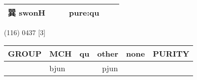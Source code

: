 \documentclass[14pt,a4paper]{scrartcl}
\begin{document}
\begin{longtable}[c]{@{}llllll@{}}
\begin{minipage}[t]{0.14\columnwidth}\raggedright\strut
巽 swonH
\strut\end{minipage} &
\begin{minipage}[t]{0.14\columnwidth}\raggedright\strut
\strut\end{minipage} &
\begin{minipage}[t]{0.14\columnwidth}\raggedright\strut
\strut\end{minipage} &
\begin{minipage}[t]{0.14\columnwidth}\raggedright\strut
pure:qu
\strut\end{minipage}\tabularnewline
\bottomrule
\end{longtable}

(116) 0437 {[}3{]}

\begin{longtable}[c]{@{}llllll@{}}
\toprule
\begin{minipage}[b]{0.14\columnwidth}\raggedright\strut
GROUP
\strut\end{minipage} &
\begin{minipage}[b]{0.14\columnwidth}\raggedright\strut
MCH
\strut\end{minipage} &
\begin{minipage}[b]{0.14\columnwidth}\raggedright\strut
qu
\strut\end{minipage} &
\begin{minipage}[b]{0.14\columnwidth}\raggedright\strut
other
\strut\end{minipage} &
\begin{minipage}[b]{0.14\columnwidth}\raggedright\strut
none
\strut\end{minipage} &
\begin{minipage}[b]{0.14\columnwidth}\raggedright\strut
PURITY
\strut\end{minipage}\tabularnewline
\midrule
\endhead
\begin{minipage}[t]{0.14\columnwidth}\raggedright\strut
𠦪
\strut\end{minipage} &
\begin{minipage}[t]{0.14\columnwidth}\raggedright\strut
bjun
\strut\end{minipage} &
\begin{minipage}[t]{0.14\columnwidth}\raggedright\strut
\strut\end{minipage} &
\begin{minipage}[t]{0.14\columnwidth}\raggedright\strut
𩞑 pjun
\strut\end{minipage} &
\begin{minipage}[t]{0.14\columnwidth}\raggedright\strut

\end{minipage}
\end{longtable}
\end{document}
